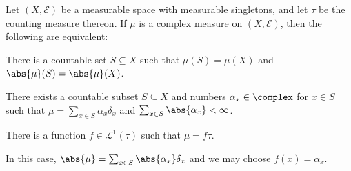 \documentclass[article, a4paper, 11pt, oneside]{memoir}
\numberwithin{equation}{chapter}
\newcommand{\calE}{\mathcal{E}}
\newcommand{\calL}{\mathcal{L}}
\begin{document}
\begin{proposition}
    Let $(X,\calE)$ be a measurable space with measurable singletons, and let $\tau$ be the counting measure thereon. If $\mu$ is a complex measure on $(X,\calE)$, then the following are equivalent:
    \begin{enumprop}
        \item There is a countable set $S \subseteq X$ such that $\mu(S) = \mu(X)$ and $\abs{\mu}(S) = \abs{\mu}(X)$.
        
        \item There exists a countable subset $S \subseteq X$ and numbers $\alpha_x \in \complex$ for $x \in S$ such that $\mu = \sum_{x \in S} \alpha_x \delta_x$ and $\sum_{x \in S} \abs{\alpha_x} < \infty$.
        
        \item There is a function $f \in \calL^1(\tau)$ such that $\mu = f \tau$.
    \end{enumprop}
    In this case, $\abs{\mu} = \sum_{x \in S} \abs{\alpha_x} \delta_x$ and we may choose $f(x) = \alpha_x$.
\end{proposition}
\end{document}
